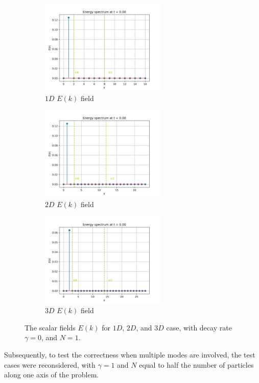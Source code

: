 \begin{figure}[H]
    \begin{subfigure}{7cm}
      \centering\includegraphics[width=6cm]{Code-Figures/espec-simple-1d/energy_spectrum.png}
      \caption{$1D$ $E(k)$ field}
    \end{subfigure}
    \begin{subfigure}{7cm}
      \centering\includegraphics[width=6cm]{Code-Figures/espec-simple-2d/energy_spectrum.png}
      \caption{$2D$ $E(k)$ field}
    \end{subfigure}
    \begin{subfigure}{7cm}
        \centering\includegraphics[width=6cm]{Code-Figures/espec-simple-3d/energy_spectrum.png}
        \caption{$3D$ $E(k)$ field}
      \end{subfigure}
    \caption{The scalar fields $E(k)$ for $1D$, $2D$, and $3D$ case, with decay rate $\gamma=0$, and $N=1$.}
    \label{fig:espec-scalar-fields-N1}
\end{figure}

Subsequently, to test the correctness when multiple modes are involved, the test cases were reconsidered, with $\gamma=1$ and $N$ equal to half the number of particles along one axis of the problem.

